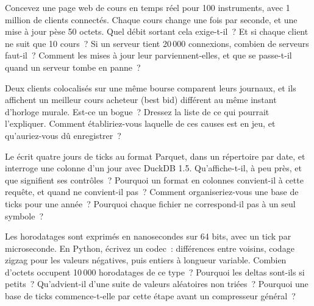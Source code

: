 \begin{question}\label{iq:iv3:system-design:16}
Concevez une page web de cours en temps réel pour 100 instruments, avec 1 million de clients connectés. Chaque cours change une fois par seconde, et une mise à jour pèse 50 octets. Quel débit sortant cela exige-t-il~? Et si chaque client ne suit que 10 cours~? Si un serveur tient 20\,000 connexions, combien de serveurs faut-il~? Comment les mises à jour leur parviennent-elles, et que se passe-t-il quand un serveur tombe en panne~?
\end{question}

\begin{question}\label{iq:iv3:system-design:17}
Deux clients colocalisés sur une même bourse comparent leurs journaux, et ils affichent un meilleur cours acheteur (best bid) différent au même instant d'horloge murale. Est-ce un bogue~? Dressez la liste de ce qui pourrait l'expliquer. Comment établiriez-vous laquelle de ces causes est en jeu, et qu'auriez-vous dû enregistrer~?
\end{question}

\begin{question}\label{iq:iv3:system-design:18}
Le  écrit quatre jours de ticks au format Parquet, dans un répertoire par date, et interroge une colonne d'un jour avec DuckDB 1.5. Qu'affiche-t-il, à peu près, et que signifient ses contrôles~? Pourquoi un format en colonnes convient-il à cette requête, et quand ne convient-il pas~? Comment organiseriez-vous une base de ticks pour une année~? Pourquoi chaque fichier ne correspond-il pas à un seul symbole~?
\label{lst:iv3:sd:columns}
\end{question}

\begin{question}\label{iq:iv3:system-design:19}
Les horodatages sont exprimés en nanosecondes sur 64 bits, avec un tick par microseconde. En Python, écrivez un codec~: différences entre voisins, codage zigzag pour les valeurs négatives, puis entiers à longueur variable. Combien d'octets occupent 10\,000 horodatages de ce type~? Pourquoi les deltas sont-ils si petits~? Qu'advient-il d'une suite de valeurs aléatoires non triées~? Pourquoi une base de ticks commence-t-elle par cette étape avant un compresseur général~?
\end{question}

